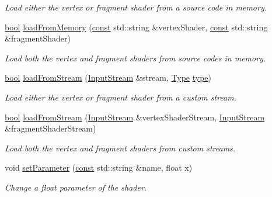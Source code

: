 \begin{DoxyCompactItemize}
\begin{DoxyCompactList}\small\item\em Load either the vertex or fragment shader from a source code in memory. \end{DoxyCompactList}\item 
\hyperlink{term__entry_8h_a002004ba5d663f149f6c38064926abac}{bool} \hyperlink{classsf_1_1_shader_ae34e94070d7547a890166b7993658a9b}{load\-From\-Memory} (\hyperlink{term__entry_8h_a57bd63ce7f9a353488880e3de6692d5a}{const} std\-::string \&vertex\-Shader, \hyperlink{term__entry_8h_a57bd63ce7f9a353488880e3de6692d5a}{const} std\-::string \&fragment\-Shader)
\begin{DoxyCompactList}\small\item\em Load both the vertex and fragment shaders from source codes in memory. \end{DoxyCompactList}\item 
\hyperlink{term__entry_8h_a002004ba5d663f149f6c38064926abac}{bool} \hyperlink{classsf_1_1_shader_a2ee1b130c0606e4f8bcdf65c1efc2a53}{load\-From\-Stream} (\hyperlink{classsf_1_1_input_stream}{Input\-Stream} \&stream, \hyperlink{classsf_1_1_shader_afaa1aa65e5de37b74d047da9def9f9b3}{Type} \hyperlink{_entity_8cpp_aa209819775142a76b8e49319d79ecab2}{type})
\begin{DoxyCompactList}\small\item\em Load either the vertex or fragment shader from a custom stream. \end{DoxyCompactList}\item 
\hyperlink{term__entry_8h_a002004ba5d663f149f6c38064926abac}{bool} \hyperlink{classsf_1_1_shader_a3b7958159ffb5596c4babc3052e35465}{load\-From\-Stream} (\hyperlink{classsf_1_1_input_stream}{Input\-Stream} \&vertex\-Shader\-Stream, \hyperlink{classsf_1_1_input_stream}{Input\-Stream} \&fragment\-Shader\-Stream)
\begin{DoxyCompactList}\small\item\em Load both the vertex and fragment shaders from custom streams. \end{DoxyCompactList}\item 
void \hyperlink{classsf_1_1_shader_a47e4dd78f0752ae08664b4ee616db1cf}{set\-Parameter} (\hyperlink{term__entry_8h_a57bd63ce7f9a353488880e3de6692d5a}{const} std\-::string \&name, float x)
\begin{DoxyCompactList}\small\item\em Change a float parameter of the shader. \end{DoxyCompactList}\item 

\end{DoxyCompactItemize}

